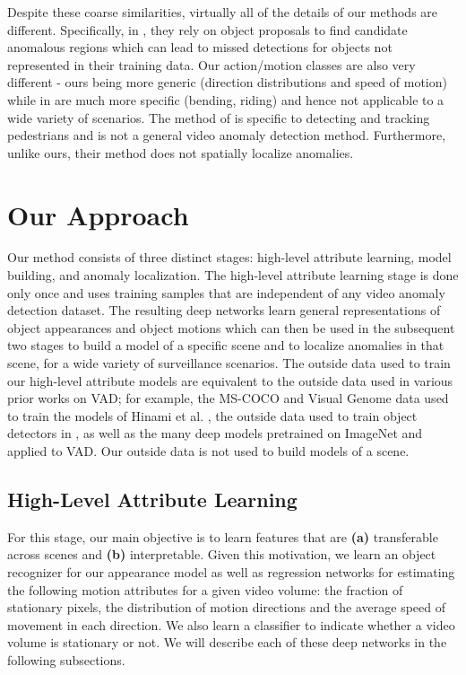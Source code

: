 Despite these coarse similarities, virtually all of the details of our methods are different. Specifically, in \cite{hinami2017joint}, they rely on object proposals to find candidate anomalous regions which can lead to missed detections for objects not represented in their training data. Our action/motion classes are also very different - ours being more generic (direction distributions and speed of motion) while in \cite{hinami2017joint} are much more specific (bending, riding) and hence not applicable to a wide variety of scenarios.
The method of \cite{wu2021explainable} is specific to detecting and tracking pedestrians and is not a general video anomaly detection method.  Furthermore, unlike ours, their method does not spatially localize anomalies.

\section{Our Approach}

Our method consists of three distinct stages: high-level attribute learning, model building, and anomaly localization.  The high-level attribute learning stage is done only once and uses training samples that are independent of any video anomaly detection dataset.  The resulting deep networks learn general representations of object appearances and object motions which can then be used in the subsequent two stages to build a model of a specific scene and to localize anomalies in that scene, for a wide variety of surveillance scenarios. The outside data used to train our high-level attribute models are equivalent to the outside data used in various prior works on VAD; for example, the MS-COCO and Visual Genome data used to train the models of Hinami et al. \cite{hinami2017joint}, the outside data used to train object detectors in \cite{georgescu2021anomaly,doshi2021efficient,ionescu2019detecting,smeureanu2017deep}, as well as the many deep models pretrained on ImageNet and applied to VAD.  Our outside data is not used to build models of a scene.

\vspace{-2pt}
\subsection{\bf{High-Level Attribute Learning}}

For this stage, our main objective is to learn features that are \textbf{(a)} transferable across scenes and \textbf{(b)} interpretable. Given this motivation, we learn an object recognizer for our appearance model as well as regression networks for estimating the following motion attributes for a given video volume: the fraction of stationary pixels, the distribution of motion directions and the average speed of movement in each direction.  We also learn a classifier to indicate whether a video volume is stationary or not.  We will describe each of these deep networks in the following subsections.

